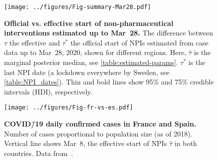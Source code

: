 \documentclass[12pt]{extarticle}
\newcommand{\covid}{COVID\=/19 }
\begin{document}
\begin{figure}[b!]
    \centering
	\texttt{[image: ../figures/Fig-summary-Mar28.pdf]}
    \caption{
    \textbf{Official vs. effective start of non-pharmaceutical interventions estimated up to Mar~28.}
    	The difference between $\tau$ the effective and $\tau^*$ the official start of NPIs estimated from case data up to Mar~28, 2020, shown for different regions. Here, $\hat{\tau}$ is the marginal posterior median, see \autoref{table:estimated-params}. $\tau^*$ is the last NPI date (a lockdown everywhere by Sweden, see \autoref{table:NPI_dates}). Thin and bold lines show 95\% and 75\% credible intervals (HDI), respectively.
    }
    \label{fig:tau-summary-mar28}
\end{figure}



\begin{figure}[h]
    \centering
	\texttt{[image: ../figures/Fig-fr-vs-es.pdf]}
    \caption{
    \textbf{\covid daily confirmed cases in France and Spain.}
    Number of cases proportional to population size (as of 2018). 
    Vertical line shows Mar~8, the effective start of NPIs $\hat{\tau}$ in both countries.
    Data from~\citet{Flaxman2020}.
    } 
    \label{fig:fig-fr-vs-es}
\end{figure}
 
\end{document}
